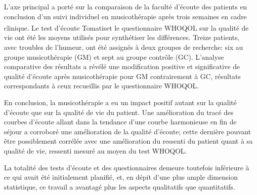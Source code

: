 
 L'axe principal a porté sur la comparaison de la faculté d'écoute des patients en conclusion d'un suivi 
 individuel en musicothérapie après trois semaines en cadre clinique.
 Le test d'écoute Tomatis\textsuperscript \textregistered  et le questionnaire WHOQOL sur la qualité de 
 vie 
 ont été les moyens 
 utilisés 
 pour synthétiser les différences. 
 Treize  patients, avec troubles de l'humeur, ont été assignés à deux groupes de recherche: 
 six au groupe
 musicothérapie (GM) et sept au groupe contrôle (GC).
  L'analyse comparative des résultats a révélé une modification positive et significative 
 de qualité d'écoute après musicothérapie 
 pour GM contrairement à GC, résultats correspondants à ceux recueillis par  %
 le questionnaire WHOQOL. 
 
 En conclusion, la musicothérapie a
 eu un impact positif autant sur la qualité d'écoute que sur la qualité de vie  du patient.
Une amélioration du tracé des courbes d'écoute allant dans la tendance d'une courbe harmonieuse en 
fin de séjour a corroboré une amélioration de la qualité d'écoute; cette dernière pouvant être 
possiblement corrélée avec une amélioration du ressenti du patient quant à sa qualité de vie, ressenti 
mesuré au moyen du test WHOQOL.

 La totalité des tests d'écoute et des questionnaires demeure toutefois 
 inférieure à ce qui avait été initialement planifié, et, en dépit d'une plus ample dimension statistique, ce 
 travail a avantagé plus les aspects qualitatifs que quantitatifs.
 
